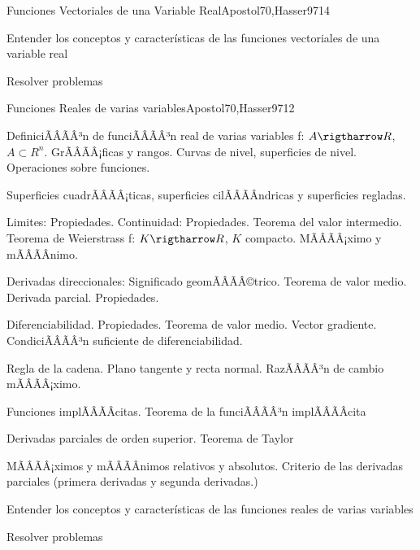 \begin{sumilla}
\begin{unit}{Funciones Vectoriales de una Variable Real}{Apostol70,Hasser97}{14}
   \begin{objetivos}
         \item  Entender los conceptos y caracter\'isticas de las funciones vectoriales de una variable real
         \item  Resolver problemas
   \end{objetivos}
\end{unit}

\begin{unit}{Funciones Reales de varias variables}{Apostol70,Hasser97}{12}
   \begin{topicos}
	\item  DefiniciÃÂÃÂ³n de funciÃÂÃÂ³n real de varias variables f: $A \rigtharrow R$, $A \subset R^n$. GrÃÂÃÂ¡ficas y rangos. Curvas de nivel, superficies de nivel. Operaciones sobre funciones.
	\item  Superficies cuadrÃÂÃÂ¡ticas, superficies cilÃÂÃÂ­ndricas y superficies regladas.
	\item  Limites: Propiedades. Continuidad: Propiedades. Teorema del valor intermedio. Teorema de Weierstrass f: $K \rigtharrow R$, $K$ compacto. MÃÂÃÂ¡ximo y mÃÂÃÂ­nimo.
	\item  Derivadas direccionales: Significado geomÃÂÃÂ©trico. Teorema de valor medio. Derivada parcial. Propiedades.
	\item  Diferenciabilidad. Propiedades. Teorema de valor medio. Vector gradiente. CondiciÃÂÃÂ³n suficiente de diferenciabilidad.
	\item  Regla de la cadena. Plano tangente y recta normal. RazÃÂÃÂ³n de cambio mÃÂÃÂ¡ximo.
	\item Funciones implÃÂÃÂ­citas. Teorema de la funciÃÂÃÂ³n implÃÂÃÂ­cita
	\item Derivadas parciales de orden superior. Teorema de Taylor
	\item MÃÂÃÂ¡ximos y mÃÂÃÂ­nimos relativos y absolutos. Criterio de las derivadas parciales (primera derivadas y segunda derivadas.)
   \end{topicos}

   \begin{objetivos}
         \item  Entender los conceptos y caracter\'isticas de las funciones reales de varias variables
         \item  Resolver problemas
   \end{objetivos}
\end{unit}


\end{sumilla}
